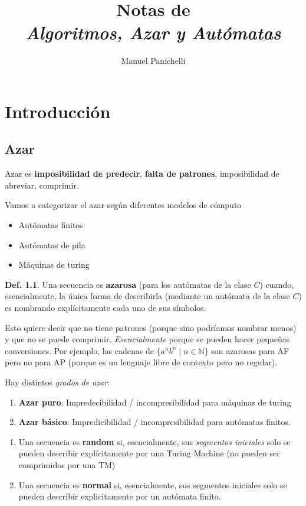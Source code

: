 \documentclass{report}
\author{Manuel Panichelli}
\title{Notas de \\\textit{Algoritmos, Azar y Autómatas}}
\theoremstyle{definition} %
\newtheorem{definition}{Def.}
\begin{document}
\maketitle

\chapter{Introducción}

\section{Azar}

Azar es \textbf{imposibilidad de predecir}, \textbf{falta de patrones},
imposibilidad de abreviar, comprimir.

Vamos a categorizar el azar según diferentes modelos de cómputo

\begin{itemize}
    \item Autómatas finitos
    \item Autómatas de pila
    \item Máquinas de turing
\end{itemize}

\begin{definition}
    Una secuencia es \textbf{azarosa} (para los autómatas de la clase $C$)
    cuando, esencialmente, la única forma de describirla (mediante un autómata
    de la clase $C$) es nombrando explícitamente cada uno de sus símbolos.
\end{definition}

Esto quiere decir que no tiene patrones (porque sino podríamos nombrar menos) y
que no se puede comprimir. \textit{Esencialmente} porque se pueden hacer
pequeñas conversiones. Por ejemplo, las cadenas de $\{a^n b^n \mid n \in
\mathbb{N}\}$ son azarosas para AF pero no para AP (porque es un lenguaje libre
de contexto pero no regular).

Hay distintos \textit{grados de azar}:

\begin{enumerate}
    \item \textbf{Azar puro}: Impredecibilidad / incompresibilidad para
    máquinas de turing
    \item \textbf{Azar básico}: Impredicibilidad / incompresibilidad para
    autómatas finitos.
\end{enumerate}

\begin{enumerate}
    \item Una secuencia es \textbf{random} si, esencialmente, sus
    \textit{segmentos iniciales} solo se pueden describir explícitamente por una
    Turing Machine (no pueden ser comprimidos por una TM)
    \item Una secuencia es \textbf{normal} si, esencialmente, sus segmentos
    iniciales solo se pueden describir explicitamente por un autómata finito.
\end{enumerate}
\end{document}
